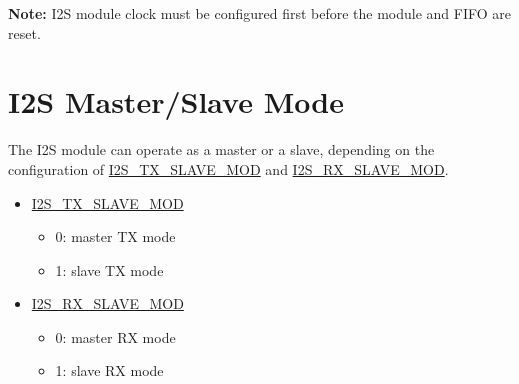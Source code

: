 \documentclass[main\_\_CN.tex]{subfiles}
\begin{document}
{\bfseries Note:}
I2S module clock must be configured first before the module and FIFO are reset.


\section{I2S Master/Slave Mode}

The \chipname{} I2S module can operate as a master or a slave, depending on the configuration of \hyperref[fielddesc:I2STXSLAVEMOD]{I2S\_TX\_SLAVE\_MOD} and \hyperref[fielddesc:I2SRXSLAVEMOD]{I2S\_RX\_SLAVE\_MOD}.


\begin{itemize}
    \item \hyperref[fielddesc:I2STXSLAVEMOD]{I2S\_TX\_SLAVE\_MOD}
    \begin{itemize}
        \item 0: master TX mode
        \item 1: slave TX mode
    \end{itemize}
    \item \hyperref[fielddesc:I2SRXSLAVEMOD]{I2S\_RX\_SLAVE\_MOD}
    \begin{itemize}
        \item 0: master RX mode
        \item 1: slave RX mode
    \end{itemize}
\end{itemize}
\end{document}
